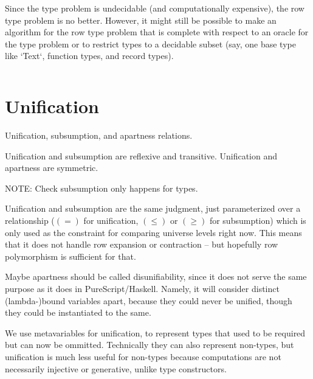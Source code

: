 \documentclass[11pt, twoside, reqno]{book}
\begin{document}
%
%
%
%

Since the type problem is undecidable (and computationally expensive), the row type problem is no better.
However, it might still be possible to make an algorithm for the row type problem that is complete with respect to an oracle for the type problem or to restrict types to a decidable subset (say, one base type like \inHS`Text`, function types, and record types).

\begin{displaymath}
\end{displaymath}






\chapter{Unification}
Unification, subsumption, and apartness relations.

Unification and subsumption are reflexive and transitive.
Unification and apartness are symmetric.

NOTE: Check subsumption only happens for types.

Unification and subsumption are the same judgment, just parameterized over a relationship ($(=)$ for unification, $(\le)$ or $(\ge)$ for subsumption) which is only used as the constraint for comparing universe levels right now.
This means that it does not handle row expansion or contraction -- but hopefully row polymorphism is sufficient for that.

Maybe apartness should be called disunifiability, since it does not serve the same purpose as it does in PureScript/Haskell.
Namely, it will consider distinct (lambda-)bound variables apart, because they could never be unified, though they could be instantiated to the same.

We use metavariables for unification, to represent types that used to be required but can now be ommitted.
Technically they can also represent non-types, but unification is much less useful for non-types because computations are not necessarily injective or generative, unlike type constructors.
\end{document}
